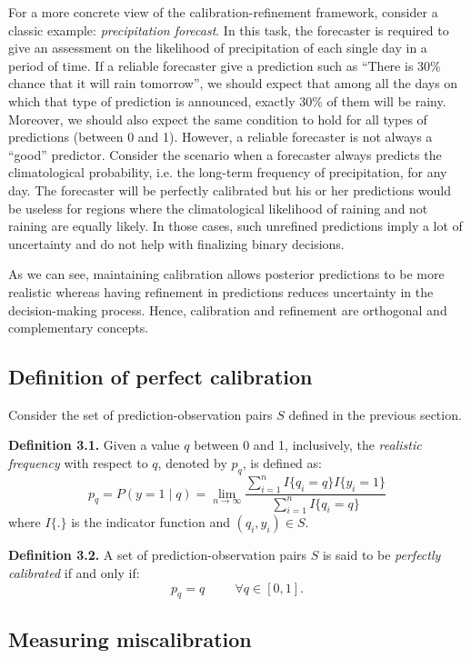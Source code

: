 For a more concrete view of the calibration-refinement framework, consider a classic example: \textit{precipitation forecast}. In this task, the forecaster is required to give an assessment on the likelihood of precipitation of each single day in a period of time. If a reliable forecaster give a prediction such as ``There is 30\% chance that it will rain tomorrow'', we should expect that among all the days on which that type of prediction is announced, exactly 30\% of them will be rainy. Moreover, we should also expect the same condition to hold for all types of predictions (between 0 and 1). However, a reliable forecaster is not always a ``good'' predictor. Consider the scenario when a forecaster always predicts the climatological probability, i.e. the long-term frequency of precipitation, for any day. The forecaster will be perfectly calibrated but his or her predictions would be useless for regions where the climatological likelihood of raining and not raining are equally likely. In those cases, such unrefined predictions imply a lot of uncertainty and do not help with finalizing binary decisions.  

As we can see, maintaining calibration allows posterior predictions to be more realistic whereas having refinement in predictions reduces uncertainty in the decision-making process. Hence, calibration and refinement are orthogonal and complementary concepts.    

\subsection{Definition of perfect calibration}

Consider the set of prediction-observation pairs $S$ defined in the previous section.

\textbf{Definition 3.1.} Given a value $q$ between 0 and 1, inclusively, the \textit{realistic frequency} with respect to $q$, denoted by $p_q$, is defined as:
$$p_q = P(y = 1 \mid q) = \lim_{n\to\infty} \frac{\sum_{i=1}^nI\{q_i = q\}I\{y_i = 1\}}{\sum_{i=1}^nI\{q_i = q\}}$$ where $I\{.\}$ is the indicator function and $(q_i, y_i) \in S$.

\textbf{Definition 3.2.} A set of prediction-observation pairs $S$ is said to be \textit{perfectly calibrated} if and only if:
$$p_q = q \hspace{1cm} \forall q \in [0, 1].$$  

\subsection{Measuring miscalibration}

